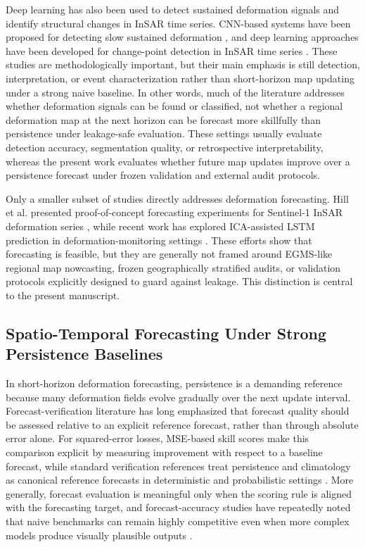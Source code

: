\documentclass[lettersize,journal]{IEEEtran}
\begin{document}
Deep learning has also been used to detect sustained deformation signals and identify structural changes in InSAR time series. CNN-based systems have been proposed for detecting slow sustained deformation \cite{anantrasirichai2019cnn}, and deep learning approaches have been developed for change-point detection in InSAR time series \cite{lattari2022changepoints}. These studies are methodologically important, but their main emphasis is still detection, interpretation, or event characterization rather than short-horizon map updating under a strong naive baseline. In other words, much of the literature addresses whether deformation signals can be found or classified, not whether a regional deformation map at the next horizon can be forecast more skillfully than persistence under leakage-safe evaluation. These settings usually evaluate detection accuracy, segmentation quality, or retrospective interpretability, whereas the present work evaluates whether future map updates improve over a persistence forecast under frozen validation and external audit protocols.

Only a smaller subset of studies directly addresses deformation forecasting. Hill et al. presented proof-of-concept forecasting experiments for Sentinel-1 InSAR deformation series \cite{hill2021forecasting}, while recent work has explored ICA-assisted LSTM prediction in deformation-monitoring settings \cite{peng2024ica}. These efforts show that forecasting is feasible, but they are generally not framed around EGMS-like regional map nowcasting, frozen geographically stratified audits, or validation protocols explicitly designed to guard against leakage. This distinction is central to the present manuscript.

\subsection{Spatio-Temporal Forecasting Under Strong Persistence Baselines}

In short-horizon deformation forecasting, persistence is a demanding reference because many deformation fields evolve gradually over the next update interval. Forecast-verification literature has long emphasized that forecast quality should be assessed relative to an explicit reference forecast, rather than through absolute error alone. For squared-error losses, MSE-based skill scores make this comparison explicit by measuring improvement with respect to a baseline forecast, while standard verification references treat persistence and climatology as canonical reference forecasts in deterministic and probabilistic settings \cite{murphy1988skill,jolliffe2012forecast}. More generally, forecast evaluation is meaningful only when the scoring rule is aligned with the forecasting target, and forecast-accuracy studies have repeatedly noted that naive benchmarks can remain highly competitive even when more complex models produce visually plausible outputs \cite{gneiting2011making,hyndman2006accuracy}.
\end{document}
